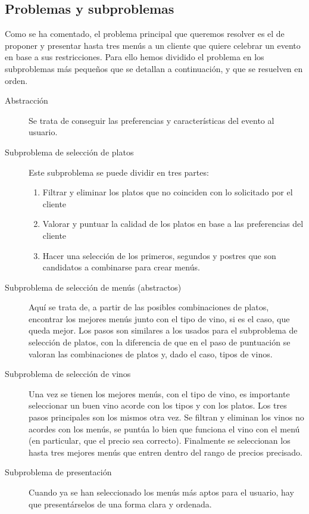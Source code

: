 \subsection{Problemas y subproblemas}
Como se ha comentado, el problema principal que queremos resolver es el de
proponer y presentar hasta tres menús a un cliente que quiere celebrar un
evento en base a sus restricciones. Para ello hemos dividido el problema en los
subproblemas más pequeños que se detallan a continuación, y que se resuelven en
orden.

\begin{description}
  \item[Abstracción] Se trata de conseguir las preferencias y características
    del evento al usuario.
  \item[Subproblema de selección de platos] Este subproblema se puede dividir
    en tres partes:
    \begin{enumerate}
      \item Filtrar y eliminar los platos que no coinciden con lo solicitado
        por el cliente        
      \item Valorar y puntuar la calidad de los platos en base a las
        preferencias del cliente
      \item Hacer una selección de los primeros, segundos y postres que son
        candidatos a combinarse para crear menús.
    \end{enumerate}
  \item[Subproblema de selección de menús (abstractos)] Aquí se trata de, a
    partir de las posibles combinaciones de platos, encontrar los mejores menús
    junto con el tipo de vino, si es el caso, que queda mejor. Los pasos son
    similares a los usados para el subproblema de selección de platos, con la
    diferencia de que en el paso de puntuación se valoran las combinaciones de
    platos y, dado el caso, tipos de vinos.
  \item[Subproblema de selección de vinos] Una vez se tienen los mejores menús,
    con el tipo de vino, es importante seleccionar un buen vino acorde con los
    tipos y con los platos. Los tres pasos principales son los mismos otra
    vez. Se filtran y eliminan los vinos no acordes con los menús, se puntúa lo
    bien que funciona el vino con el menú (en particular, que el precio sea
    correcto). Finalmente se seleccionan los hasta tres mejores menús que
    entren dentro del rango de precios precisado.
  \item[Subproblema de presentación] Cuando ya se han seleccionado los menús
    más aptos para el usuario, hay que presentárselos de una forma clara y
    ordenada.
\end{description}
